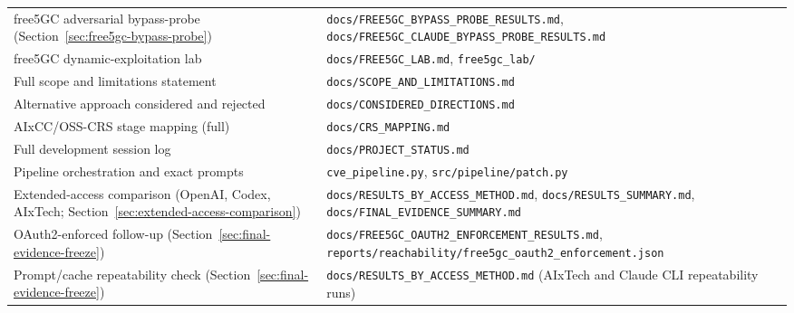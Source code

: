 \documentclass[12pt,a4paper]{report}
\begin{document}
\begin{longtable}{@{}p{6.5cm}p{6cm}@{}}
free5GC adversarial bypass-probe (Section~\ref{sec:free5gc-bypass-probe}) & \texttt{docs/\allowbreak FREE5GC\_BYPASS\_PROBE\_RESULTS.md}, \texttt{docs/\allowbreak FREE5GC\_CLAUDE\_BYPASS\_PROBE\_RESULTS.md} \\
free5GC dynamic-exploitation lab & \texttt{docs/\allowbreak FREE5GC\_LAB.md}, \texttt{free5gc\_lab/} \\
Full scope and limitations statement & \texttt{docs/\allowbreak SCOPE\_AND\_\allowbreak LIMITATIONS.md} \\
Alternative approach considered and rejected & \texttt{docs/\allowbreak CONSIDERED\_\allowbreak DIRECTIONS.md} \\
AIxCC/OSS-CRS stage mapping (full) & \texttt{docs/\allowbreak CRS\_MAPPING.md} \\
Full development session log & \texttt{docs/\allowbreak PROJECT\_STATUS.md} \\
Pipeline orchestration and exact prompts & \texttt{cve\_pipeline.py}, \texttt{src/\allowbreak pipeline/\allowbreak patch.py} \\
Extended-access comparison (OpenAI, Codex, AIxTech; Section~\ref{sec:extended-access-comparison}) & \texttt{docs/\allowbreak RESULTS\_BY\_ACCESS\_METHOD.md}, \texttt{docs/\allowbreak RESULTS\_SUMMARY.md}, \texttt{docs/\allowbreak FINAL\_EVIDENCE\_SUMMARY.md} \\
OAuth2-enforced follow-up (Section~\ref{sec:final-evidence-freeze}) & \texttt{docs/\allowbreak FREE5GC\_OAUTH2\_ENFORCEMENT\_RESULTS.md}, \texttt{reports/\allowbreak reachability/\allowbreak free5gc\_oauth2\_enforcement.json} \\
Prompt/cache repeatability check (Section~\ref{sec:final-evidence-freeze}) & \texttt{docs/\allowbreak RESULTS\_BY\_ACCESS\_METHOD.md} (AIxTech and Claude CLI repeatability runs) \\
\end{longtable}
\end{document}
